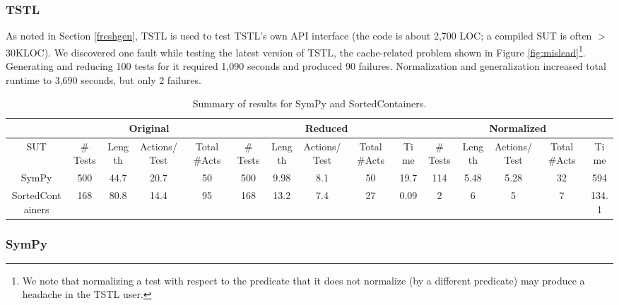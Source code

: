 \subsubsection{TSTL}

As noted in Section \ref{freshgen}, TSTL is used to test TSTL's own
API interface (the code is about 2,700 LOC; a compiled SUT is
often $>$ 30KLOC).  We discovered one fault while testing
the latest version of TSTL, the cache-related problem shown in Figure
\ref{fig:mislead}\footnote{We note that normalizing a test with
  respect to the predicate that it does not normalize (by a different
  predicate) may produce a headache in the TSTL user.}.
Generating and reducing 100 tests for it required 1,090 seconds
and produced 90 failures.  Normalization and generalization
increased total runtime to 3,690 seconds, but only 2
failures.


\begin{table}
\caption{Summary of results for SymPy and SortedContainers.}
{\scriptsize
\begin{tabular}{c|cccc|ccccc|ccccc}
& \multicolumn{4}{c|}{Original} & \multicolumn{5}{c|}{Reduced} &
                                                               \multicolumn{5}{c}{Normalized}
  \\
\hline
SUT & \# Tests & Length & Actions/Test & Total \#Acts & \# Tests & Length
                                     & Actions/Test & Total \#Acts
  & Time  & \# Tests & Length & Actions/Test & Total \#Acts & Time \\
\hline
SymPy & 500 & 44.7 & 20.7& 50 & 500 & 9.98 & 8.1 & 50 & 19.7 & 114 &
                                                                     5.48
  & 5.28 & 32 & 594 \\
SortedContainers & 168 & 80.8 & 14.4 & 95 & 168 & 13.2 & 7.4 & 27 & 0.09 & 2 & 6
                              & 5 & 7 & 134.1 \\
\hline
\end{tabular}
}
\label{sumreduction}
\end{table}

\subsubsection{SymPy}


